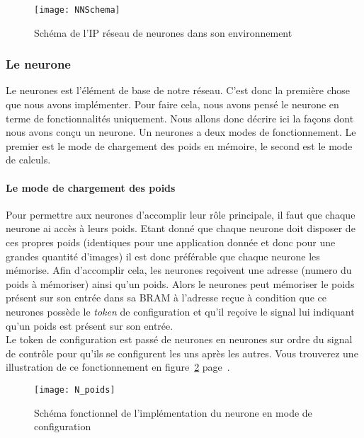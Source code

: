 \begin{figure}[h!]
	\begin{center}
		\texttt{[image: NNSchema]}
		\label{fig:NNSchema}
		\caption{Schéma de l'IP réseau de neurones dans son environnement }
	\end{center}
\end{figure}

\subsubsection{Le neurone}
	Le neurones est l'élément de base de notre réseau.
	C'est donc la première chose que nous avons implémenter.
	Pour faire cela, nous avons pensé le neurone en terme de
	fonctionnalités uniquement.
	Nous allons donc décrire ici la façons dont nous avons conçu un neurone. 
	Un neurones a deux modes de fonctionnement.
	Le premier est le mode de chargement des poids en mémoire, le second
	est le mode de calculs.

	\paragraph{Le mode de chargement des poids\\}
	
	Pour permettre aux neurones d'accomplir leur rôle principale, il faut que chaque neurone ai
	accès à leurs poids. Etant donné que chaque neurone doit disposer de ces propres poids
	(identiques pour une application donnée et donc pour une grandes quantité d'images)
	il est donc préférable que chaque neurone les mémorise. Afin d'accomplir cela,
	les neurones reçoivent une adresse (numero du poids à mémoriser) ainsi qu'un poids.
	Alors le neurones peut mémoriser le poids présent sur son entrée dans
	sa BRAM à l'adresse reçue à condition que ce neurones possède le {\em token} de
	configuration et qu'il reçoive le signal lui indiquant qu'un poids est présent sur son entrée.\\
	Le token de configuration est passé de neurones en neurones
	sur ordre du signal de contrôle pour qu'ils se configurent les uns après les autres.
	Vous trouverez une illustration de ce fonctionnement en
	figure~\ref{fig:N_poids} page~\pageref{fig:N_poids}.
	\begin{figure}[h!]
		\begin{center}
			\texttt{[image: N\_poids]}
			\caption{Schéma fonctionnel de l'implémentation du neurone en mode de configuration}
			\label{fig:N_poids}
		\end{center}
	\end{figure}

